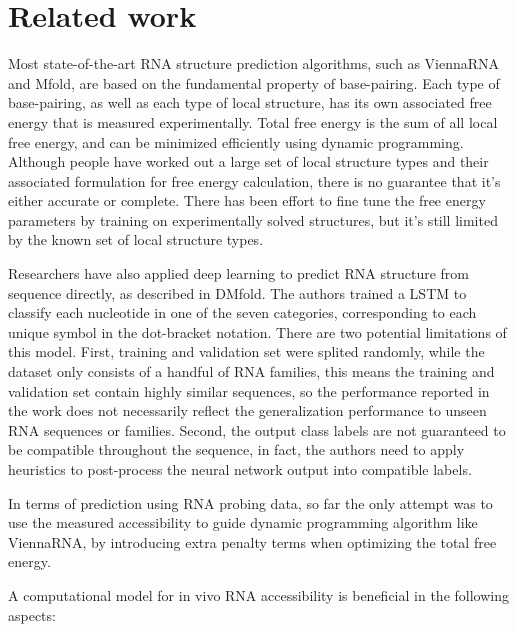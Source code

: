 \documentclass{proposal}
\begin{document}


\section{Related work}

Most state-of-the-art RNA structure prediction algorithms, such as ViennaRNA\cite{lorenz2011viennarna} and Mfold\cite{zuker2003mfold},
are based on the fundamental property of base-pairing.
Each type of base-pairing, as well as each type of local structure, has its own associated free energy that is measured experimentally.
Total free energy is the sum of all local free energy, and can be minimized efficiently using dynamic programming.
Although people have worked out a large set of local structure types and their associated formulation for free energy calculation,
there is no guarantee that it's either accurate or complete.
There has been effort to fine tune the free energy parameters by training on experimentally solved structures\cite{andronescu2007efficient},
but it's still limited by the known set of local structure types.


Researchers have also applied deep learning to predict RNA structure from sequence directly, as described in DMfold\cite{wang2019dmfold}.
The authors trained a LSTM to classify each nucleotide in one of the seven categories,
corresponding to each unique symbol in the dot-bracket notation.
There are two potential limitations of this model.
First, training and validation set were splited randomly, while the dataset only consists of a handful of RNA families,
this means the training and validation set contain highly similar sequences,
so the performance reported in the work does not necessarily reflect the generalization performance to unseen RNA sequences or families.
Second, the output class labels are not guaranteed to be compatible throughout the sequence, in fact,
the authors need to apply heuristics to post-process the neural network output into compatible labels.

In terms of prediction using RNA probing data,
so far the only attempt was to use the measured accessibility to guide dynamic programming algorithm like ViennaRNA\cite{lorenz2011viennarna},
by introducing extra penalty terms when optimizing the total free energy.

A computational model for in vivo RNA accessibility is beneficial in the following aspects:
\end{document}
